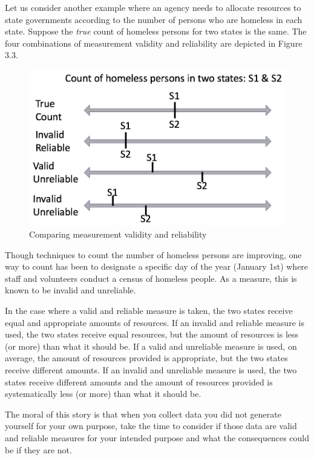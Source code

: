 \documentclass[
]{book}
\begin{document}
Let us consider another example where an agency needs to allocate resources to state governments according to the number of persons who are homeless in each state. Suppose the \emph{true} count of homeless persons for two states is the same. The four combinations of measurement validity and reliability are depicted in Figure 3.3.

\begin{figure}
\includegraphics[width=12.76in]{images/measure_lines} \caption{Comparing measurement validity and reliability}\label{fig:unnamed-chunk-7}
\end{figure}

Though techniques to count the number of homeless persons are improving, one way to count has been to designate a specific day of the year (January 1st) where staff and volunteers conduct a census of homeless people. As a measure, this is known to be invalid and unreliable.

In the case where a valid and reliable measure is taken, the two states receive equal and appropriate amounts of resources. If an invalid and reliable measure is used, the two states receive equal resources, but the amount of resources is less (or more) than what it should be. If a valid and unreliable measure is used, on average, the amount of resources provided is appropriate, but the two states receive different amounts. If an invalid and unreliable measure is used, the two states receive different amounts and the amount of resources provided is systematically less (or more) than what it should be.

The moral of this story is that when you collect data you did not generate yourself for your own purpose, take the time to consider if those data are valid and reliable measures for your intended purpose and what the consequences could be if they are not.
\end{document}

